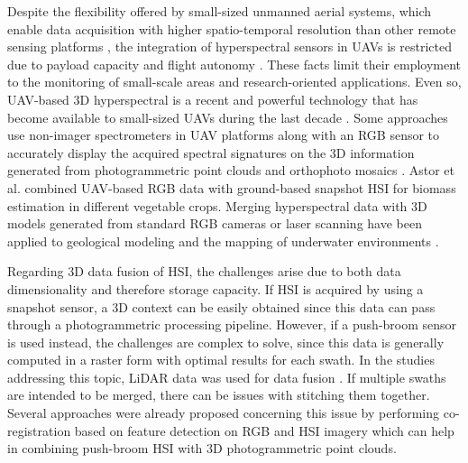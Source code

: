 Despite the flexibility offered by small-sized unmanned aerial systems, which enable data acquisition with higher spatio-temporal resolution than other remote sensing platforms \cite{padua_uas_2017}, the integration of hyperspectral sensors in UAVs is restricted due to payload capacity and flight autonomy \cite{bruning_approaches_2020}. These facts limit their employment to the monitoring of small-scale areas and research-oriented applications. Even so, UAV-based 3D hyperspectral is a recent and powerful technology that has become available to small-sized UAVs during the last decade \cite{nevalainen_individual_2017}. Some approaches use non-imager spectrometers in UAV platforms along with an RGB sensor to accurately display the acquired spectral signatures on the 3D information generated from photogrammetric point clouds and orthophoto mosaics \cite{garzonio_surface_2017}. Astor et al. \cite{astor_vegetable_2020} combined UAV-based RGB data with ground-based snapshot HSI for biomass estimation in different vegetable crops. Merging hyperspectral data with 3D models generated from standard RGB cameras or laser scanning have been applied to geological modeling \cite{nieto_3d_2010} and the mapping of underwater environments \cite{ferrera_hyperspectral_2021}.

Regarding 3D data fusion of HSI, the challenges arise due to both data dimensionality and therefore storage capacity. If HSI is acquired by using a snapshot sensor, a 3D context can be easily obtained since this data can pass through a photogrammetric processing pipeline. However, if a push-broom sensor is used instead, the challenges are complex to solve, since this data is generally computed in a raster form with optimal results for each swath. In the studies addressing this topic, LiDAR data was used for data fusion \cite{lin_detection_2019, sankey_uav_2018}. If multiple swaths are intended to be merged, there can be issues with stitching them together. Several approaches were already proposed concerning this issue by performing co-registration based on feature detection on RGB and HSI imagery \cite{angel_automated_2020, jurado_efficient_2021, akhoundi_khezrabad_new_2022} which can help in combining push-broom HSI with 3D photogrammetric point clouds. 

